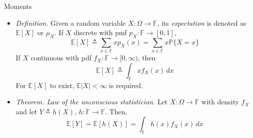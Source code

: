 \documentclass{beamer}
\numberwithin{equation}{section}
\begin{document}
\begin{frame}{Moments}
    \begin{itemize}
        \item
        \textit{Definition.} Given a random variable
        $ X : \Omega \rightarrow \mathbb{F} $, its \textit{expectation} is
        denoted as $ \mathbb{E}[X] $ or $ \mu_X $. If $ X $ discrete with pmf
        $ p_X : \mathbb{F} \rightarrow [0, 1] $,
        \begin{equation*}
            \mathbb{E}[X] \triangleq \sum_{x \in \mathbb{F}}xp_X(x) =
            \sum_{x \in \mathbb{F}}x\mathbb{P}\{X = x\}
        \end{equation*}
        If $ X $ continuous with pdf
        $ f_X : \mathbb{F} \rightarrow [0, \infty) $, then
        \begin{equation*}
            \mathbb{E}[X] \triangleq \int_\mathbb{F}xf_X(x)\,dx
        \end{equation*}
        For $ \mathbb{E}[X] $ to exist, $ \mathbb{E}|X| < \infty $ is required.

        \item
        \textit{Theorem. Law of the unconscious statistician.} Let
        $ X : \Omega \rightarrow \mathbb{F} $ with
        density\footnotemark{} $ f_X $ and let
        $ Y \triangleq h(X) $, $ h : \mathbb{F} \rightarrow \mathbb{F} $. Then,
        \begin{equation*}
            \mathbb{E}[Y] = \mathbb{E}[h(X)] = \int_\mathbb{F}h(x)f_X(x)\,dx
        \end{equation*}
    \end{itemize}

    \medskip

\end{frame}
\end{document}
